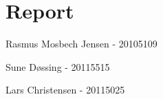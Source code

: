 \section{Report}

Rasmus Mosbech Jensen - 20105109

Sune D\o ssing - 20115515 

Lars Christensen - 20115025

